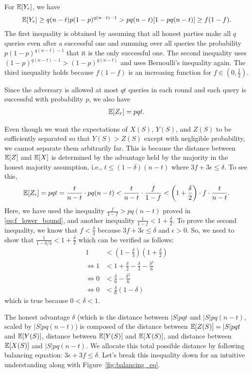 For $\mathbb{E}[Y_r]$, we have
\begin{align}
\label{eq:y_lower_bound}
    \mathbb{E}[Y_r]  \geq q(n-t)p (1-p)^{q(n-t)-1} > pq(n-t)[1-pq(n-t)] \geq f (1-f).
\end{align}
The first inequality is obtained by assuming that all honest parties make all $q$ queries even after a successful one and summing over all queries the probability $p(1-p)^{q(n-t)-1}$ that it is the only successful one.
The second inequality uses $(1-p)^{q(n-t)-1} > (1-p)^{q(n-t)}$ and uses Bernoulli's inequality again.
The third inequality holds because $f(1-f)$ is an increasing function for $f \in (0,\frac12)$.

Since the adversary is allowed at most $qt$ queries in each round and each query is successful with probability $p$, we also have
\begin{align}
    \mathbb{E}[Z_r] = pqt.
\end{align}

Even though we want the expectations of $X(S)$, $Y(S)$, and $Z(S)$ to be sufficiently separated so that $Y(S) > Z(S)$ except with negligible probability, we cannot separate them arbitrarily far. This is because the distance between $\mathbb{E}[Z]$ and $\mathbb{E}[X]$ is determined by the advantage held by the majority in the honest majority assumption, i.e., $t \leq (1-\delta)(n-t)$ where $3f+3\epsilon \leq \delta$.
To see this,
\begin{align}
    \mathbb{E}[Z_r] = pqt = \frac{t}{n-t} \cdot pq(n-t) < \frac{t}{n-t} \cdot \frac{f}{1-f} < \left(1+\frac{\delta}{2}\right)\cdot f \cdot \frac{t}{n-t}.
\end{align}
Here, we have used the inequality $\frac{f}{1-f} > pq(n-t)$ proved in \eqref{eq:f_lower_bound}, and another inequality $\frac{1}{1-f} < 1 + \frac{\delta}{2}$. To prove the second inequality, we know that $f < \frac{\delta}{3}$ because $3f+3\epsilon \leq \delta$ and $\epsilon>0$. So, we need to show that $\frac{1}{1-\delta/3} < 1+\frac{\delta}{2}$ which can be verified as follows:
\begin{align*}
    1 &< \left(1-\frac{\delta}{3}\right) \left(1+\frac{\delta}{2}\right) \\
    \iff 1 &< 1 + \frac{\delta}{2} - \frac{\delta}{3} - \frac{\delta^2}{6} \\
    \iff 0 &< \frac{\delta}{6} - \frac{\delta^2}{6} \\
    \iff 0 &< \frac{\delta}{6}(1-\delta)
\end{align*}
which is true because $0 < \delta < 1$.

The honest advantage $\delta$ (which is the distance between $|S|pqt$ and $|S|pq(n-t)$, scaled by $|S|pq(n-t)$) is composed of the distance between $\mathbb{E}[Z(S)]=|S|pqt$ and $\mathbb{E}[Y(S)]$, distance between $\mathbb{E}[Y(S)]$ and $\mathbb{E}[X(S)]$, and distance between $\mathbb{E}[X(S)]$ and $|S|pq(n-t)$. We allocate this total possible distance by following balancing equation: $3\epsilon + 3f \leq \delta$. Let's break this inequality down for an intuitive understanding along with Figure~\ref{fig:balancing_eq}.

